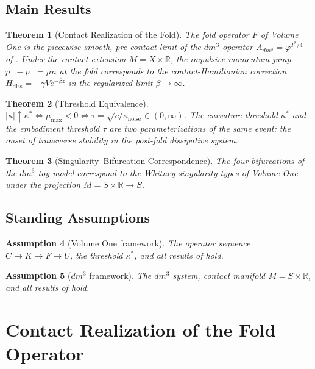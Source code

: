 \documentclass[11pt]{article}
\theoremstyle{boxed}
\newtheorem{theorem}{Theorem}[section]
\newtheorem{assumption}[theorem]{Assumption}
\begin{document}
\subsection{Main Results}

\begin{theorem}[Contact Realization of the Fold]\label{thm:A}
The fold operator $F$ of Volume One is the piecewise-smooth, pre-contact limit of
the $dm^3$ operator $A_{dm^3} = \varphi^{T^{*}/4}$ of \cite{GCM}. Under the contact
extension $M = X \times \mathbb{R}$, the impulsive momentum jump
$p^{+} - p^{-} = \mu n$ at the fold corresponds to the contact-Hamiltonian
correction $H_{\mathrm{diss}} = -\gamma V e^{-\beta z}$ in the regularized limit
$\beta \to \infty$.
\end{theorem}

\begin{theorem}[Threshold Equivalence]\label{thm:B}
$|\kappa| \uparrow \kappa^{*} \iff \mu_{\max} < 0 \iff \tau = \sqrt{c/\kappa_{\mathrm{noise}}} \in (0,\infty)$.
The curvature threshold $\kappa^{*}$ and the embodiment threshold $\tau$ are two
parameterizations of the same event: the onset of transverse stability in the
post-fold dissipative system.
\end{theorem}

\begin{theorem}[Singularity--Bifurcation Correspondence]\label{thm:C}
The four bifurcations of the $dm^3$ toy model \cite{dm3} correspond to the Whitney
singularity types of Volume One under the projection $M = S \times \mathbb{R} \to S$.
\end{theorem}

\subsection{Standing Assumptions}

\begin{assumption}[Volume One framework]
The operator sequence $C \to K \to F \to U$, the threshold $\kappa^{*}$, and all
results of \cite{VolI} hold.
\end{assumption}

\begin{assumption}[$dm^3$ framework]
The $dm^3$ system, contact manifold $M = S \times \mathbb{R}$, and all results
of \cite{GCM,dm3} hold.
\end{assumption}

\section{Contact Realization of the Fold Operator}
\end{document}
